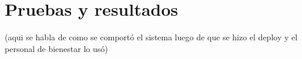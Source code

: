 \chapter{Pruebas y resultados}
(aqui se habla de como se comportó el sistema luego de que se hizo el deploy y el personal de bienestar lo usó)